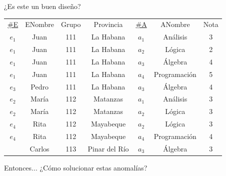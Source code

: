 \begin{frame}{¿Es este un buen dise\~no?}
    \centering
    \begin{tabular}{ccccccc}
        \underline{\#E} & ENombre & Grupo & Provincia & \underline{\#A} & ANombre & Nota\\
        $e_1$ & Juan & 111 & La Habana & $a_1$ & An\'alisis & 3\\
        $e_1$ & Juan & 111 & La Habana & $a_2$ & L\'ogica & 2\\
        $e_1$ & Juan & 111 & La Habana  & $a_3$ & \'Algebra & 4\\
        $e_1$ & Juan & 111 & La Habana & $a_4$ & Programaci\'on & 5\\
        $e_3$ & Pedro & 111 & La Habana & $a_3$ & \'Algebra & 4\\
        $e_2$ & Mar\'ia & 112 &  Matanzas & $a_1$ & An\'alisis & 3\\
        $e_2$ & Mar\'ia &  112 & Matanzas & $a_2$ & L\'ogica & 3\\
        $e_4$ & Rita & 112 & Mayabeque & $a_2$ & L\'ogica & 3\\
        $e_4$ & Rita &  112 & Mayabeque & $a_4$ & Programaci\'on & 4\\
        \onslide<-1>{
        $e_5$ & Carlos &  113 & Pinar del R\'io & $a_3$ & \'Algebra & 3
        }
    \end{tabular}
    \vspace{5mm}


\end{frame}

\begin{frame}{Entonces...}
    \centering
    \Large ¿C\'omo solucionar estas anomal\'ias?
\end{frame}

